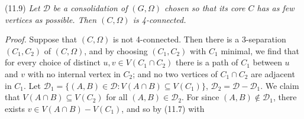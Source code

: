 \stmt
(11.9) \textit{Let $\mathcal{D}$ be a consolidation of $(G, \Omega)$ chosen so that its core $C$ has as few vertices as possible. Then $(C, \Omega)$ is 4-connected.}

\textit{Proof.} Suppose that $(C, \Omega)$ is not 4-connected. Then there is a 3-separation $(C_1, C_2)$ of $(C, \Omega)$, and by choosing $(C_1, C_2)$ with $C_1$ minimal, we find that for every choice of distinct $u, v \in V(C_1 \cap C_2)$ there is a path of $C_1$ between $u$ and $v$ with no internal vertex in $C_2$; and no two vertices of $C_1 \cap C_2$ are adjacent in $C_1$. Let $\mathcal{D}_1 = \{(A, B) \in \mathcal{D}: V(A \cap B) \subseteq V(C_1)\}$, $\mathcal{D}_2 = \mathcal{D} - \mathcal{D}_1$. We claim that $V(A \cap B) \subseteq V(C_2)$ for all $(A, B) \in \mathcal{D}_2$. For since $(A, B) \notin \mathcal{D}_1$, there exists $v \in V(A \cap B) - V(C_1)$, and so by (11.7) with
